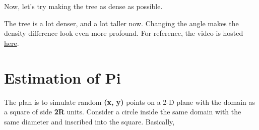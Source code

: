 \documentclass{resonance}
\begin{document}
\setlength{\leftskip}{-0cm}
Now, let's try making the tree as dense as possible.\\

\pagebreak
\begin{figure}[h]
    \vspace{10pt}
    \hskip -0.7cm
\end{figure}

The tree is a lot denser, and a lot taller now. Changing the angle makes the density difference look even more profound. For reference, the video is hosted \textcolor{blue}{\href{https://bit.ly/fractals_simulation}{here}}.

\section{Estimation of Pi}

The plan is to simulate random \textbf{(x, y)} points on a 2-D plane with the domain as a square of side \textbf{2R} units. Consider a circle inside the same domain with the same diameter and inscribed into the square. Basically,
\end{document}
